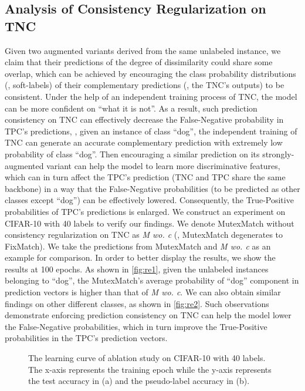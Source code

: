 \documentclass[lettersize,journal]{IEEEtran}
\theoremstyle{plain}
\theoremstyle{definition}
\theoremstyle{remark}
\begin{document}
\subsection{Analysis of Consistency Regularization on TNC}
\label{dis_section}
Given two augmented variants derived from the same unlabeled instance, we claim that their predictions of the degree of dissimilarity could share some overlap, which can be achieved by encouraging the class probability distributions (\ie, soft-labels) of their complementary predictions (\ie, the TNC's outputs) to be consistent. 
Under the help of an independent training process of TNC, the model can be more confident on ``what it is not''. As a result, such prediction consistency on TNC can effectively decrease the False-Negative probability in TPC's predictions,  
\eg, given an instance of class ``dog'', the independent training of TNC can generate an accurate complementary prediction with extremely low probability of class ``dog''. Then encouraging a similar prediction on its strongly-augmented variant can help the model to learn more discriminative features, which can in turn affect the TPC's prediction (TNC and TPC share the same backbone) in a way that the False-Negative probabilities (to be predicted as other classes except ``dog'') can be effectively lowered. Consequently, the True-Positive probabilities of TPC's predictions is enlarged.
We construct an experiment on CIFAR-10 with 40 labels to verify our findings. We denote MutexMatch without consistency regularization on TNC as \textit{M wo. c} (\ie, MutexMatch degenerates to FixMatch).
We take the predictions from MutexMatch and \textit{M wo. c} as an example for comparison. In order to better display the results, we show the results at 100 epochs.
As shown  in \cref{fig:re1}, given the unlabeled instances belonging to ``dog'', the MutexMatch's average probability of ``dog'' component in prediction vectors is higher than that of \textit{M wo. c}.
We can also obtain similar findings on other different classes, as shown  in \cref{fig:re2}. 
Such observations demonstrate enforcing prediction consistency on TNC can  help the model lower the False-Negative probabilities, which in turn improve the True-Positive probabilities in the TPC's prediction vectors. 
\begin{figure}[t] 
\centering
    
   \hfil
    \vskip 0in
    \caption{The learning curve of ablation study on CIFAR-10 with 40 labels. The x-axis represents the training epoch while the y-axis represents the test accuracy in (a) and the pseudo-label accuracy in (b).}
    \label{fig3}

  \end{figure}
\end{document}
